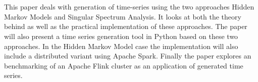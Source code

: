 \chapter{\abstractname}



This paper deals with generation of time-series using the two approaches Hidden Markov Models and Singular Spectrum Analysis. It looks at both the theory behind as well as the practical implementation of these approaches. The paper will also present a time series generation tool in Python based on these two approaches. In the Hidden Markov Model case the implementation will also include a distributed variant using Apache Spark. Finally the paper explores an benchmarking of an Apache Flink cluster as an application of generated time series. 